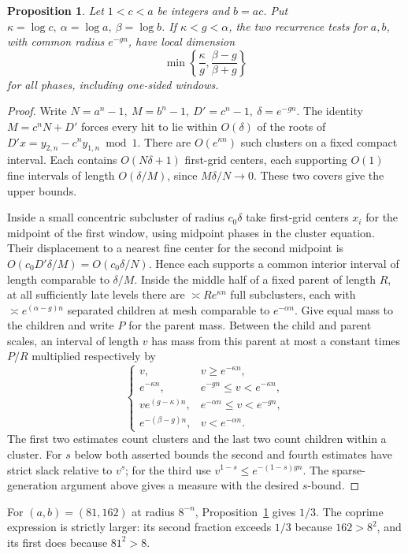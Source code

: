 \documentclass[11pt,a4paper,reqno]{amsart}
\newtheorem{proposition}[theorem]{Proposition}
\theoremstyle{definition}
\theoremstyle{remark}
\numberwithin{equation}{section}
\begin{document}
\begin{proposition}\label{prop:shared}
Let \(1<c<a\) be integers and \(b=ac\). Put \(\kappa=\log c,\ \alpha=\log a,\ \beta=\log b\). If \(\kappa<g<\alpha\), the two recurrence tests for \(a,b\), with common radius \(e^{-gn}\), have local dimension
\[
                   \min\left\{\frac{\kappa}{g},\frac{\beta-g}{\beta+g}\right\}
\]
for all phases, including one-sided windows.
\end{proposition}
\begin{proof}
Write \(N=a^n-1,\ M=b^n-1,\ D'=c^n-1,\ \delta=e^{-gn}\). The identity \(M=c^nN+D'\) forces every hit to lie within \(O(\delta)\) of the roots of \(D'x=y_{2,n}-c^n y_{1,n}\bmod1\). There are \(O(e^{\kappa n})\) such clusters on a fixed compact interval. Each contains \(O(N\delta+1)\) first-grid centers, each supporting \(O(1)\) fine intervals of length \(O(\delta/M)\), since \(M\delta/N\to0\). These two covers give the upper bounds.

Inside a small concentric subcluster of radius \(c_0\delta\) take first-grid centers \(x_i\) for the midpoint of the first window, using midpoint phases in the cluster equation. Their displacement to a nearest fine center for the second midpoint is \(O(c_0D'\delta/M)=O(c_0\delta/N)\). Hence each supports a common interior interval of length comparable to \(\delta/M\). Inside the middle half of a fixed parent of length \(R\), at all sufficiently late levels there are \(\asymp R e^{\kappa n}\) full subclusters, each with \(\asymp e^{(\alpha-g)n}\) separated children at mesh comparable to \(e^{-\alpha n}\). Give equal mass to the children and write \(P\) for the parent mass. Between the child and parent scales, an interval of length \(v\) has mass from this parent at most a constant times \(P/R\) multiplied respectively by
\[
 \begin{cases}
 v,&v\ge e^{-\kappa n},\\
 e^{-\kappa n},& e^{-gn}\le v<e^{-\kappa n},\\
 v e^{(g-\kappa)n},&e^{-\alpha n}\le v<e^{-gn},\\
 e^{-(\beta-g)n},&v<e^{-\alpha n}.
 \end{cases}
\]
The first two estimates count clusters and the last two count children within a cluster. For \(s\) below both asserted bounds the second and fourth estimates have strict slack relative to \(v^s\); for the third use \(v^{1-s}\le e^{-(1-s)gn}\). The sparse-generation argument above gives a measure with the desired \(s\)-bound.
\end{proof}
For \((a,b)=(81,162)\) at radius \(8^{-n}\), Proposition~\ref{prop:shared} gives \(1/3\). The coprime expression is strictly larger: its second fraction exceeds \(1/3\) because \(162>8^2\), and its first does because \(81^2>8\).
\end{document}
